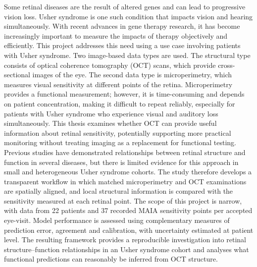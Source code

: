 Some retinal diseases are the result of altered genes and can lead to progressive vision loss. Usher syndrome is one such condition that impacts vision and hearing simultaneously. With recent advances in gene therapy research, it has become increasingly important to measure the impacts of therapy objectively and efficiently. This project addresses this need using a use case involving patients with Usher syndrome. Two image-based data types are used. The structural type consists of optical coherence tomography (OCT) scans, which provide cross-sectional images of the eye. The second data type is microperimetry, which measures visual sensitivity at different points of the retina. Microperimetry provides a functional measurement; however, it is time-consuming and depends on patient concentration, making it difficult to repeat reliably, especially for patients with Usher syndrome who experience visual and auditory loss simultaneously. This thesis examines whether OCT can provide useful information about retinal sensitivity, potentially supporting more practical monitoring without treating imaging as a replacement for functional testing. Previous studies have demonstrated relationships between retinal structure and function in several diseases, but there is limited evidence for this approach in small and heterogeneous Usher syndrome cohorts. The study therefore develops a transparent workflow in which matched microperimetry and OCT examinations are spatially aligned, and local structural information is compared with the sensitivity measured at each retinal point. The scope of this project is narrow, with data from 22 patients and 37 recorded MAIA sensitivity points per accepted eye-visit. Model performance is assessed using complementary measures of prediction error, agreement and calibration, with uncertainty estimated at patient level. The resulting framework provides a reproducible investigation into retinal structure--function relationships in an Usher syndrome cohort and analyses what functional predictions can reasonably be inferred from OCT structure.
